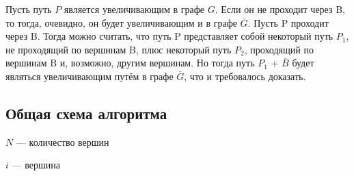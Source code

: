 \documentclass[14pt, a4paper]{extarticle}
\begin{document}
    Пусть путь $P$ является увеличивающим в графе $G$. Если он не проходит через B, то тогда, очевидно, он будет увеличивающим и в графе $\overline G$. Пусть P проходит через B. Тогда можно считать, что путь P представляет собой некоторый путь $P_1$, не проходящий по вершинам B, плюс некоторый путь $P_2$, проходящий по вершинам B и, возможно, другим вершинам. Но тогда путь $P_1$ + $\overline B$ будет являться увеличивающим путём в графе $\overline G$, что и требовалось доказать.

    \pagebreak
    
    \subsection*{Общая схема алгоритма}



    $N$ --- количество вершин
    
    $i$ --- вершина
\end{document}
